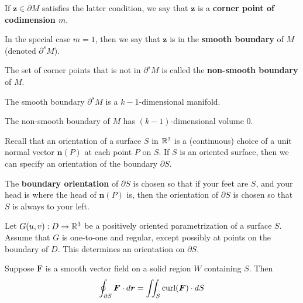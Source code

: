 \begin{definition}
        If $\bm{z} \in \partial M$ satisfies the latter condition, we say that $\bm{z}$ is a \textbf{corner point of codimension $m$}.
        
        \vspace{1em}
        
        In the special case $m = 1$, then we say that $\bm{z}$ is in the \textbf{smooth boundary} of $M$ (denoted $\partial^s M$).
        
        \vspace{1em}
        
        The set of corner points that is not in $\partial^s M$ is called the \textbf{non-smooth boundary} of $M$.
    \end{definition}

\begin{proposition}
    The smooth boundary $\partial^s M$ is a $k-1$-dimensional manifold.
    \end{proposition}


    \begin{proposition}
    The non-smooth boundary of $M$ has $(k-1)$-dimensional volume 0.
    \end{proposition}

Recall that an orientation of a surface $S$ in $\mathbb{R}^3$ is a (continuous) choice of a unit normal vector $\bm{n}(P)$ at each point $P$ on $S$.  If $S$ is an oriented surface, then we can specify an orientation of the boundary $\partial S$.

\begin{definition}
    
    The \textbf{boundary orientation} of $\partial S$ is chosen so that if your feet are $S$, and your head is where the head of $\bm{n}(P)$ is, then the orientation of $\partial S$ is chosen so that $S$ is always to your left.
    
\end{definition}

\begin{theorem}
    Let $G(u,v) : D \to \mathbb{R}^3$ be a positively oriented parametrization of a surface $S$.  Assume that $G$ is one-to-one and regular, except possibly at points on the boundary of $D$.  This determines an orientation on $\partial S$.
    
    \vspace{1em}
    
    Suppose $\bm{F}$ is a smooth vector field on a solid region $W$ containing $S$. Then
    $$\oint_{\partial S} \bm{F} \cdot d\bm{r} = \iint_S \textnormal{curl}(\bm{F}) \cdot dS$$
    
    \end{theorem}

